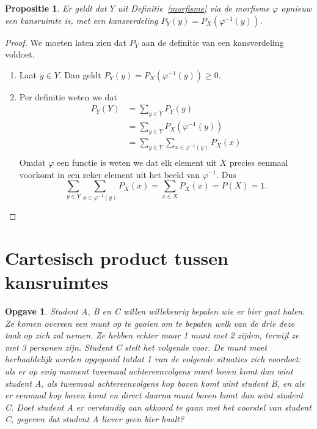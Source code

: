 \documentclass[a4paper]{book}
\newtheorem{proposition}[theorem]{Propositie}
\newtheorem{exercise}[theorem]{Opgave}
\theoremstyle{definition}
\begin{document}
\begin{proposition}
    Er geldt dat $Y$ uit Definitie~\ref{morfisme} via de morfisme $\varphi$ opnieuw een kansruimte is, met een kansverdeling $P_Y(y) = P_X(\varphi^{-1}(y))$.
\end{proposition}
\begin{proof}
    We moeten laten zien dat $P_Y$ aan de definitie van een kansverdeling voldoet.

    \begin{enumerate}[i]
        \item Laat $y \in Y$. Dan geldt $P_Y(y) =  P_X(\varphi^{-1}(y)) \geq 0$.
        \item Per definitie weten we dat
        \begin{align*}
            P_Y(Y) &= \sum_{y \in Y} P_Y(y) \\
                   &= \sum_{y \in Y} P_X(\varphi^{-1}(y)) \\
                   &= \sum_{y \in Y} \sum_{x \in \varphi^{-1}(y)} P_X(x) \\
        \end{align*}
        Omdat $\varphi$ een functie is weten we dat elk element uit $X$ precies eenmaal voorkomt in een zeker element uit het beeld van $\varphi^{-1}$.
        Dus \[ \sum_{y \in Y} \sum_{x \in \varphi^{-1}(y)} P_X(x) = \sum_{x \in X} P_X(x) = P(X) = 1. \]
    \end{enumerate}
\end{proof}


\section{Cartesisch product tussen kansruimtes}


\begin{exercise}
Student A, B en C willen willekeurig bepalen wie er bier gaat halen.
Ze komen overeen een munt op te gooien om te bepalen welk van de drie deze taak op zich zal nemen.
Ze hebben echter maar 1 munt met 2 zijden, terwijl ze met 3 personen zijn. Student C stelt het volgende voor. De munt moet herhaaldelijk worden opgegooid
totdat 1 van de volgende situaties zich voordoet: als er op enig moment tweemaal achtereenvolgens munt boven komt dan wint student A, als tweemaal
achtereenvolgens kop boven komt wint student B, en als er eenmaal kop boven komt en direct daarna munt boven komt dan wint student C. Doet student A er
verstandig aan akkoord te gaan met het voorstel van student C, gegeven dat student A liever geen bier haalt?
\end{exercise}
\end{document}

